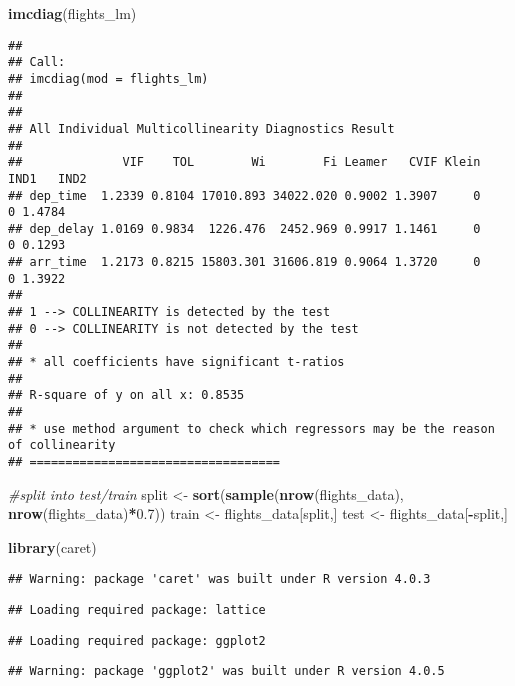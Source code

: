 \documentclass[
]{article}
\newenvironment{Shaded}{\begin{snugshade}}{\end{snugshade}}
\newcommand{\CommentTok}[1]{\textcolor[rgb]{0.56,0.35,0.01}{\textit{#1}}}
\newcommand{\FloatTok}[1]{\textcolor[rgb]{0.00,0.00,0.81}{#1}}
\newcommand{\KeywordTok}[1]{\textcolor[rgb]{0.13,0.29,0.53}{\textbf{#1}}}
\newcommand{\NormalTok}[1]{#1}
\newcommand{\OperatorTok}[1]{\textcolor[rgb]{0.81,0.36,0.00}{\textbf{#1}}}
\newcommand{\StringTok}[1]{\textcolor[rgb]{0.31,0.60,0.02}{#1}}
\begin{document}
\begin{Shaded}
\begin{Highlighting}[]
\KeywordTok{imcdiag}\NormalTok{(flights_lm)}
\end{Highlighting}
\end{Shaded}

\begin{verbatim}
## 
## Call:
## imcdiag(mod = flights_lm)
## 
## 
## All Individual Multicollinearity Diagnostics Result
## 
##              VIF    TOL        Wi        Fi Leamer   CVIF Klein IND1   IND2
## dep_time  1.2339 0.8104 17010.893 34022.020 0.9002 1.3907     0    0 1.4784
## dep_delay 1.0169 0.9834  1226.476  2452.969 0.9917 1.1461     0    0 0.1293
## arr_time  1.2173 0.8215 15803.301 31606.819 0.9064 1.3720     0    0 1.3922
## 
## 1 --> COLLINEARITY is detected by the test 
## 0 --> COLLINEARITY is not detected by the test
## 
## * all coefficients have significant t-ratios
## 
## R-square of y on all x: 0.8535 
## 
## * use method argument to check which regressors may be the reason of collinearity
## ===================================
\end{verbatim}

\begin{Shaded}
\begin{Highlighting}[]
\CommentTok{#split into test/train}
\NormalTok{split <-}\StringTok{ }\KeywordTok{sort}\NormalTok{(}\KeywordTok{sample}\NormalTok{(}\KeywordTok{nrow}\NormalTok{(flights_data), }\KeywordTok{nrow}\NormalTok{(flights_data)}\OperatorTok{*}\FloatTok{0.7}\NormalTok{))}
\NormalTok{train <-}\StringTok{ }\NormalTok{flights_data[split,]}
\NormalTok{test <-}\StringTok{ }\NormalTok{flights_data[}\OperatorTok{-}\NormalTok{split,]}


\KeywordTok{library}\NormalTok{(caret)}
\end{Highlighting}
\end{Shaded}

\begin{verbatim}
## Warning: package 'caret' was built under R version 4.0.3
\end{verbatim}

\begin{verbatim}
## Loading required package: lattice
\end{verbatim}

\begin{verbatim}
## Loading required package: ggplot2
\end{verbatim}

\begin{verbatim}
## Warning: package 'ggplot2' was built under R version 4.0.5
\end{verbatim}
\end{document}
